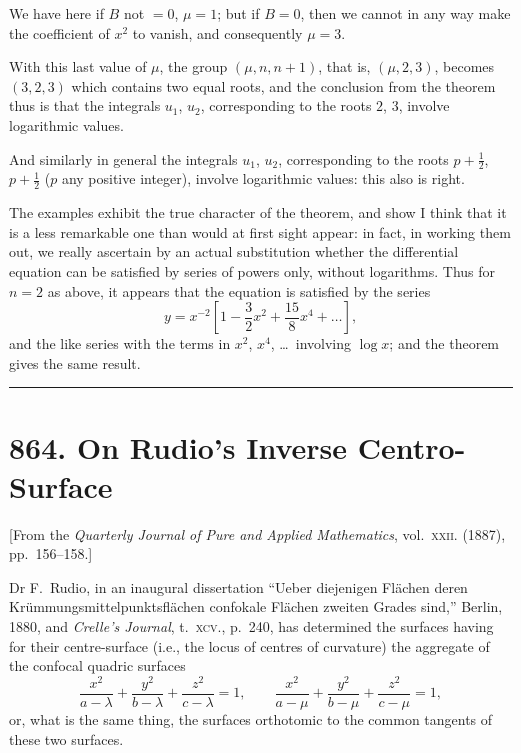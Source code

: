 \documentclass[11pt,a4paper]{book}
\begin{document}
We have here if $B$ not $= 0$, $\mu = 1$; but if $B = 0$, then we cannot in any way make the coefficient of $x^2$ to vanish, and consequently $\mu = 3$.

With this last value of $\mu$, the group $(\mu, n, n + 1)$, that is, $(\mu, 2, 3)$, becomes $(3, 2, 3)$ which contains two equal roots, and the conclusion from the theorem thus is that the integrals $u_1$, $u_2$, corresponding to the roots $2$, $3$, involve logarithmic values.

And similarly in general the integrals $u_1$, $u_2$, corresponding to the roots $p + \tfrac{1}{2}$, $p + \tfrac{1}{2}$ ($p$ any positive integer), involve logarithmic values: this also is right.

The examples exhibit the true character of the theorem, and show I think that it is a less remarkable one than would at first sight appear: in fact, in working them out, we really ascertain by an actual substitution whether the differential equation can be satisfied by series of powers only, without logarithms. Thus for $n = 2$ as above, it appears that the equation is satisfied by the series
\[
y = x^{-2}\left[1 - \frac{3}{2}x^2 + \frac{15}{8}x^4 + \ldots\right],
\]
and the like series with the terms in $x^2$, $x^4$, \ldots\ involving $\log x$; and the theorem gives the same result.

\vspace{12pt}
\hrule
\vspace{12pt}

\section*{864. On Rudio's Inverse Centro-Surface}

\begin{center}
[From the \textit{Quarterly Journal of Pure and Applied Mathematics}, vol.~\textsc{xxii}. (1887), pp.~156--158.]
\end{center}

Dr F.~Rudio, in an inaugural dissertation ``Ueber diejenigen Fl\"achen deren Kr\"ummungsmittelpunktsfl\"achen confokale Fl\"achen zweiten Grades sind,'' Berlin, 1880, and \textit{Crelle's Journal}, t.~\textsc{xcv}., p.~240, has determined the surfaces having for their centre-surface (i.e., the locus of centres of curvature) the aggregate of the confocal quadric surfaces
\[
\frac{x^2}{a - \lambda} + \frac{y^2}{b - \lambda} + \frac{z^2}{c - \lambda} = 1, \qquad
\frac{x^2}{a - \mu} + \frac{y^2}{b - \mu} + \frac{z^2}{c - \mu} = 1,
\]
or, what is the same thing, the surfaces orthotomic to the common tangents of these two surfaces.
\end{document}
